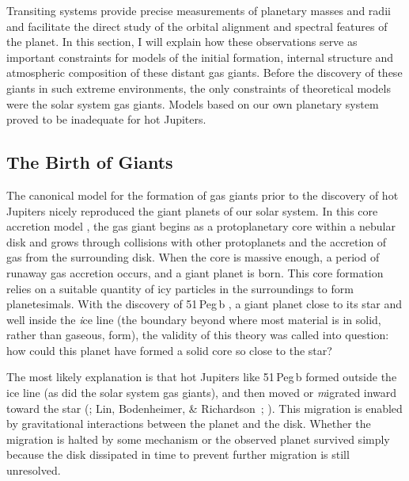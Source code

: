 Transiting systems provide precise measurements of planetary masses and radii and facilitate the direct study of the orbital alignment and spectral features of the planet.
In this section, I will explain how these observations serve as important constraints for models of the initial formation, internal structure and atmospheric composition of these distant gas giants.
Before the discovery of these giants in such extreme environments, the only constraints of theoretical models were the solar system gas giants.
Models based on our own planetary system proved to be inadequate for hot Jupiters.

\subsection{The Birth of Giants}\label{cha:intro:sec:form:subsec:birth}

The canonical model for the formation of gas giants prior to the discovery of hot Jupiters nicely reproduced the giant planets of our solar system.
In this core accretion model \citep[see, e.g.,][]{Pollack:araa:1984a,Pollack_Hubickyj_Bodenheimer:icarus:1996a}, the gas giant begins as a protoplanetary core within a nebular disk and grows through collisions with other protoplanets and the accretion of gas from the surrounding disk.
When the core is massive enough, a period of runaway gas accretion occurs, and a giant planet is born.
This core formation relies on a suitable quantity of icy particles in the surroundings to form planetesimals.
With the discovery of \mbox{51\,Peg\,b} \citep{Mayor_Queloz:nat:1995a}, a giant planet close to its star and well inside the {\textit ice line} (the boundary beyond where most material is in solid, rather than gaseous, form), the validity of this theory was called into question: how could this planet have formed a solid core so close to the star?

The most likely explanation is that hot Jupiters like \mbox{51\,Peg\,b} formed outside the ice line (as did the solar system gas giants), and then moved or {\textit migrated} inward toward the star (\citealp{Goldreich_Tremaine:apj:1980a}; Lin, Bodenheimer, \& Richardson~\citeyear{Lin_Bodenheimer_Richardson:nat:1996a}; \citealp{Trilling_Benz_Guillot:apj:1998a}).
This migration is enabled by gravitational interactions between the planet and the disk.
Whether the migration is halted by some mechanism or the observed planet survived simply because the disk dissipated in time to prevent further migration is still unresolved.

